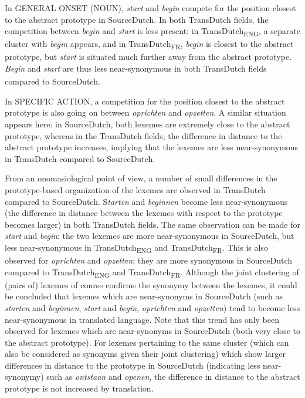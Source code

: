 In GENERAL ONSET (NOUN), \textit{start} and \textit{begin} compete for the position closest to the abstract prototype in SourceDutch. In both TransDutch fields, the competition between \textit{begin} and \textit{start} is less present: in TransDutch\textsubscript{ENG}, a separate cluster with \textit{begin} appears, and in TransDutch\textsubscript{FR}, \textit{begin} is closest to the abstract prototype, but \textit{start} is situated much further away from the abstract prototype. \textit{Begin} and \textit{start} are thus less near-synonymous in both TransDutch\textsubscript{} fields compared to SourceDutch.

In {SPECIFIC} ACTION, a competition for the position closest to the abstract prototype is also going on between \textit{oprichten} and \textit{opzetten}. A similar situation appears here: in SourceDutch, both lexemes are extremely close to the abstract prototype, whereas in the TransDutch fields, the difference in distance to the abstract prototype increases, implying that the lexemes are less near-synonymous in TransDutch compared to SourceDutch.

From an onomasiological point of view, a number of small differences in the prototype-based organization of the lexemes are observed in TransDutch compared to SourceDutch. S\textit{tarten} and \textit{beginnen} become less near-synonymous (the difference in distance between the lexemes with respect to the prototype becomes larger) in both TransDutch fields. The same observation can be made for \textit{start} and \textit{begin}: the two lexemes are more near-synonymous in SourceDutch, but less near-synonymous in TransDutch\textsubscript{ENG} and TransDutch\textsubscript{FR}. This is also observed for \textit{oprichten} and \textit{opzetten}: they are more synonymous in SourceDutch compared to TransDutch\textsubscript{ENG} and TransDutch\textsubscript{FR}. Although the joint clustering of (pairs of) lexemes of course confirms the synonymy between the lexemes, it could be concluded that lexemes which are near-synonyms in SourceDutch (such as \textit{starten} and \textit{beginnen}, \textit{start} and \textit{begin}, \textit{oprichten} and \textit{opzetten}) tend to become less near-synonymous in translated language. Note that this trend has only been observed for lexemes which are near-synonyms in SourceDutch (both very close to the abstract prototype). For lexemes pertaining to the same cluster (which can also be considered as synonyms given their joint clustering) which show larger differences in distance to the prototype in SourceDutch (indicating less near-synonymy) such as \textit{ontstaan} and \textit{openen}, the difference in distance to the abstract prototype is not increased by translation.

